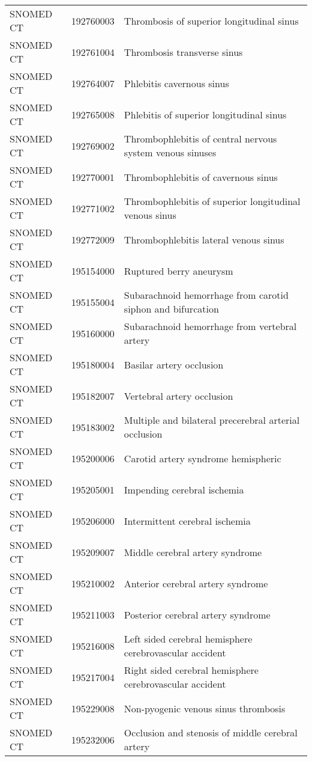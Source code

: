 \begin{longtable}{p{}p{}p{}}
  SNOMED CT & 192760003 & Thrombosis of superior longitudinal sinus \\ 
  SNOMED CT & 192761004 & Thrombosis transverse sinus \\ 
  SNOMED CT & 192764007 & Phlebitis cavernous sinus \\ 
  SNOMED CT & 192765008 & Phlebitis of superior longitudinal sinus \\ 
  SNOMED CT & 192769002 & Thrombophlebitis of central nervous system venous sinuses \\ 
  SNOMED CT & 192770001 & Thrombophlebitis of cavernous sinus \\ 
  SNOMED CT & 192771002 & Thrombophlebitis of superior longitudinal venous sinus \\ 
  SNOMED CT & 192772009 & Thrombophlebitis lateral venous sinus \\ 
  SNOMED CT & 195154000 & Ruptured berry aneurysm \\ 
  SNOMED CT & 195155004 & Subarachnoid hemorrhage from carotid siphon and bifurcation \\ 
  SNOMED CT & 195160000 & Subarachnoid hemorrhage from vertebral artery \\ 
  SNOMED CT & 195180004 & Basilar artery occlusion \\ 
  SNOMED CT & 195182007 & Vertebral artery occlusion \\ 
  SNOMED CT & 195183002 & Multiple and bilateral precerebral arterial occlusion \\ 
  SNOMED CT & 195200006 & Carotid artery syndrome hemispheric \\ 
  SNOMED CT & 195205001 & Impending cerebral ischemia \\ 
  SNOMED CT & 195206000 & Intermittent cerebral ischemia \\ 
  SNOMED CT & 195209007 & Middle cerebral artery syndrome \\ 
  SNOMED CT & 195210002 & Anterior cerebral artery syndrome \\ 
  SNOMED CT & 195211003 & Posterior cerebral artery syndrome \\ 
  SNOMED CT & 195216008 & Left sided cerebral hemisphere cerebrovascular accident \\ 
  SNOMED CT & 195217004 & Right sided cerebral hemisphere cerebrovascular accident \\ 
  SNOMED CT & 195229008 & Non-pyogenic venous sinus thrombosis \\ 
  SNOMED CT & 195232006 & Occlusion and stenosis of middle cerebral artery \\ 

\end{longtable}
